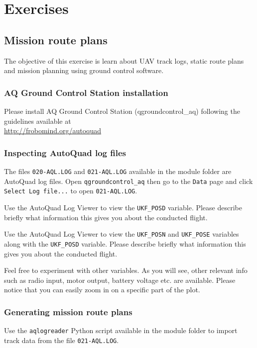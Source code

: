\documentclass[a4paper,10pt,fleqn]{article}
\begin{document}
\section{Exercises}

\subsection{Mission route plans}

The objective of this exercise is learn about UAV track logs, static route plans and mission planning using ground control software. 

\subsubsection{AQ Ground Control Station installation}
\label{aqgcs}
Please install AQ Ground Control Station (qgroundcontrol\_aq) following the guidelines available at  \\ \href{http://frobomind.org/autoquad/doku.php?id=gcs:aq_ground_control_station}{http://frobomind.org/autoquad}


\subsubsection{Inspecting AutoQuad log files}
The files \texttt{020-AQL.LOG} and \texttt{021-AQL.LOG} available in the module folder are AutoQuad log files. Open \texttt{qgroundcontrol\_aq} then go to the \texttt{Data} page and click \texttt{Select Log file...} to open \texttt{021-AQL.LOG}.

Use the AutoQuad Log Viewer to view the \texttt{UKF\_POSD} variable. Please describe briefly what information this gives you about the conducted flight.

Use the AutoQuad Log Viewer to view the \texttt{UKF\_POSN} and \texttt{UKF\_POSE} variables along with the \texttt{UKF\_POSD} variable. Please describe briefly what information this gives you about the conducted flight. 

Feel free to experiment with other variables. As you will see, other relevant info such as radio input, motor output, battery voltage etc. are available. Please notice that you can easily zoom in on a specific part of the plot.

\subsubsection{Generating mission route plans}
Use the \texttt{aqlogreader} Python script available in the module folder to import track data from the file \texttt{021-AQL.LOG}. 
\end{document}
